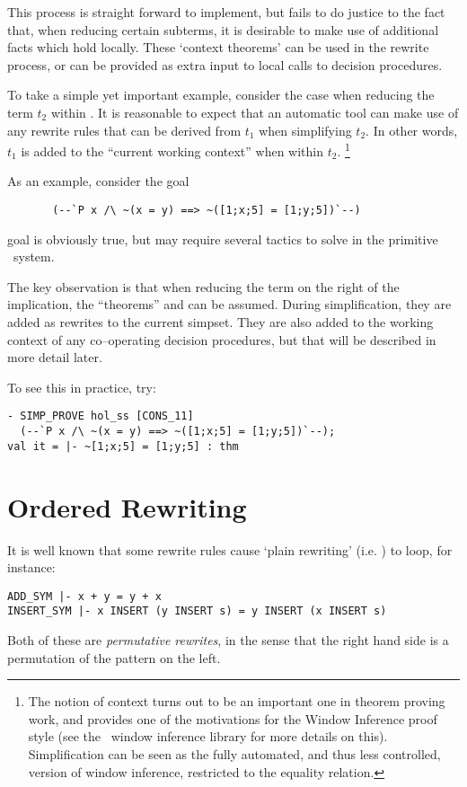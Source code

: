 This process is straight forward to implement, but fails to do justice to the
fact that, when reducing certain subterms, it is desirable
to make use of additional facts which hold
locally.  These `context theorems' can be used
in the rewrite process, or can be provided as extra input to
local calls to decision procedures.

To take a simple yet important example, consider
the case when reducing the term $t_2$ within .
It is reasonable to expect that an automatic tool can make use of any rewrite
rules that can be derived from $t_1$ when simplifying $t_2$.
In other words, $t_1$ is added to the ``current working context'' when
within $t_2$. \footnote{The notion of context turns out to be an important one
in theorem proving work, and provides one of the
motivations for the Window Inference proof style (see the
\HOL\ window inference library for more details on this).
Simplification can be seen as the fully automated, and thus
less controlled, version of window inference, restricted to the equality
relation.}

As an example, consider the goal
\begin{verbatim}
       (--`P x /\ ~(x = y) ==> ~([1;x;5] = [1;y;5])`--)
\end{verbatim}
goal is obviously true, but may require several tactics to solve
in the primitive \HOL\ system.

The key observation is that when reducing the term on the right of the
implication, the ``theorems''  and  can
be assumed.  During simplification, they are added as
rewrites to the current simpset.  They are also added to the
working context of any co--operating decision procedures, but that
will be described in more detail later.

To see this in practice, try:
\begin{boxed} \begin{verbatim}
- SIMP_PROVE hol_ss [CONS_11]
  (--`P x /\ ~(x = y) ==> ~([1;x;5] = [1;y;5])`--);
val it = |- ~[1;x;5] = [1;y;5] : thm
\end{verbatim} \end{boxed}


\section{Ordered Rewriting}

\label{ordered-rewriting}

It is well known that some rewrite rules cause `plain rewriting'
(i.e. ) to loop, for instance:
\begin{hol} \begin{verbatim}
ADD_SYM |- x + y = y + x
INSERT_SYM |- x INSERT (y INSERT s) = y INSERT (x INSERT s)
\end{verbatim} \end{hol}
Both of these are {\em permutative rewrites}, in the sense that
the right hand side is a permutation of the pattern on the left.

